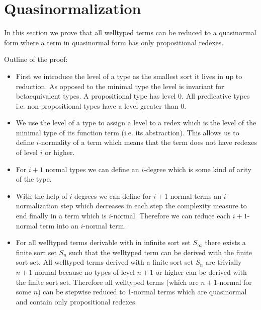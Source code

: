 \section{Quasinormalization}


In this section we prove that all welltyped terms can be reduced to a
quasinormal form where a term in quasinormal form has only propositional
redexes.

Outline of the proof:
\begin{itemize}
    \item First we introduce the level of a type as the smallest sort it lives
        in up to reduction. As opposed to the minimal type the level is
        invariant for betaequivalent types. A propositional type has level 0.
        All predicative types i.e. non-propositional types have a level greater
        than 0.

    \item We use the level of a type to assign a level to a redex which is the
        level of the minimal type of its function term (i.e. its abstraction).
        This allows us to define $i$-normality of a term which means that the
        term does not have redexes of level $i$ or higher.

    \item For $i+1$ normal types we can define an $i$-degree which is some kind
        of arity of the type.

    \item With the help of $i$-degrees we can define for $i+1$ normal terms an
        $i$-normalization step which decreases in each step the complexity
        measure to end finally in a term which is $i$-normal. Therefore we can
        reduce each $i+1$-normal term into an $i$-normal term.

    \item For all welltyped terms derivable with in infinite sort set $S_\infty$
        there exists a finite sort set $S_n$ such that the welltyped term can be
        derived with the finite sort set. All welltyped terms derived with a
        finite sort set $S_n$ are trivially $n+1$-normal because no types of
        level $n+1$ or higher can be derived with the finite sort set. Therefore
        all welltyped terms (which are $n+1$-normal for some $n$) can be
        stepwise reduced to 1-normal terms which are quasinormal and contain
        only propositional redexes.
\end{itemize}






